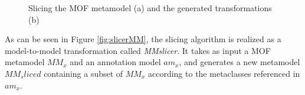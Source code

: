 \begin{figure}
  \centering
 \hspace{10mm}
  \caption{Slicing the MOF metamodel (a) and the generated transformations (b)}
  \label{fig:slicer}
\end{figure}
%
As can be seen in Figure \ref{fig:slicerMM}, the slicing algorithm is realized as a model-to-model transformation called \textit{MMslicer}.
It takes as input a MOF metamodel $MM_x$ and an annotation model $am_x$, and generates a new metamodel $MM_sliced$ containing
a subset of $MM_x$ according to the metaclasses referenced in $am_x$.

